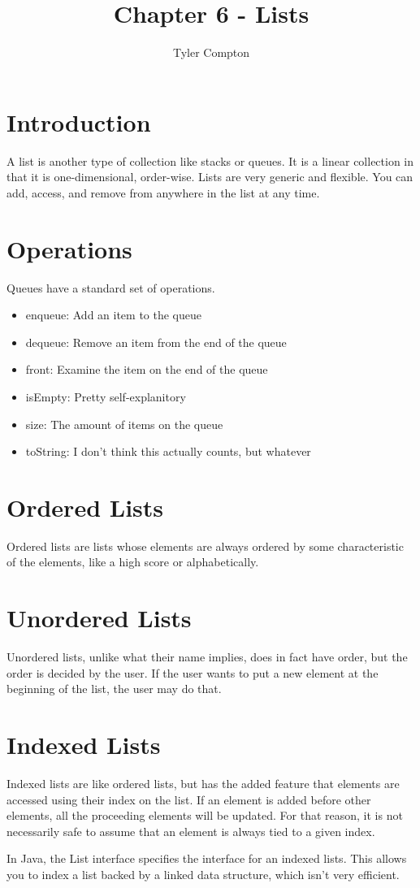 \documentclass{article}
\author{Tyler Compton}
\title{Chapter 6 - Lists}
\begin{document}
\maketitle
\tableofcontents

\section{Introduction}
A list is another type of collection like stacks or queues. It is a linear
collection in that it is one-dimensional, order-wise. Lists are very generic
and flexible. You can add, access, and remove from anywhere in the list at any
time.

\section{Operations}
Queues have a standard set of operations.

\begin{itemize}
	\item enqueue: Add an item to the queue
	\item dequeue: Remove an item from the end of the queue
	\item front: Examine the item on the end of the queue
	\item isEmpty: Pretty self-explanitory
	\item size: The amount of items on the queue
	\item toString: I don't think this actually counts, but whatever
\end{itemize}

\section{Ordered Lists}
Ordered lists are lists whose elements are always ordered by some
characteristic of the elements, like a high score or alphabetically.

\section{Unordered Lists}
Unordered lists, unlike what their name implies, does in fact have order, but
the order is decided by the user. If the user wants to put a new element at the
beginning of the list, the user may do that.

\section{Indexed Lists}
Indexed lists are like ordered lists, but has the added feature that elements
are accessed using their index on the list. If an element is added before other
elements, all the proceeding elements will be updated. For that reason, it is
not necessarily safe to assume that an element is always tied to a given index.

In Java, the List interface specifies the interface for an indexed lists. This
allows you to index a list backed by a linked data structure, which isn't very
efficient.
\end{document}
